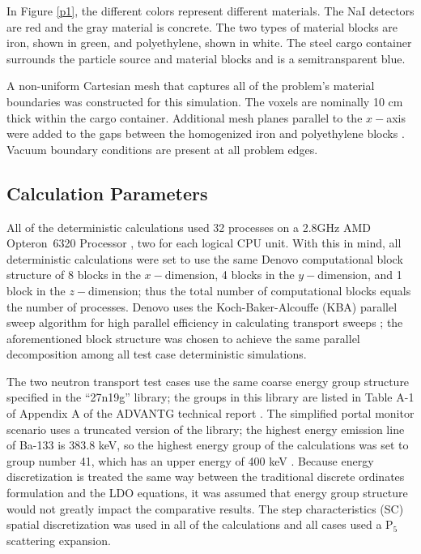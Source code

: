 \documentclass{article} %
\begin{document}
In Figure \ref{p1}, the different colors represent different materials. The NaI
detectors are red and the gray material is concrete. The two types of material
blocks are iron, shown in green, and polyethylene, shown in white. The steel
cargo container surrounds the particle source and material blocks and is a
semitransparent blue.

A non-uniform Cartesian mesh that captures all of the problem's material
boundaries was constructed for this simulation. The voxels are nominally 10 cm
thick within the cargo container. Additional mesh planes parallel to the
$x-$axis were added to the gaps between the homogenized iron and polyethylene
blocks \cite{advantg}. Vacuum boundary conditions are present at all problem
edges.

\subsection{Calculation Parameters}

All of the deterministic calculations used 32 processes on a 2.8GHz AMD 
Opteron\texttrademark\ 6320 Processor \cite{amd}, two for each logical CPU
unit. With this in mind, all deterministic calculations were set to use the
same Denovo computational block structure of 8 blocks 
in the $x-$dimension, 4 blocks in the $y-$dimension, and 1 block in the 
$z-$dimension; thus the total number of computational blocks equals the number
of processes. Denovo uses the Koch-Baker-Alcouffe (KBA) parallel sweep
algorithm for high parallel efficiency in calculating transport sweeps
\cite{denovo}; the aforementioned block structure was chosen to achieve the
same parallel decomposition among all test case deterministic simulations. 

The two neutron transport test cases use the same coarse energy group structure
specified in  the ``27n19g'' library; the groups in this library are listed in 
Table A-1 of Appendix A of the ADVANTG technical report \cite{advantg}.
The simplified portal monitor scenario uses a truncated version of the library;
the highest energy emission line of Ba-133 is 383.8 keV, so the highest energy
group of the calculations was set to group number 41, which has an upper energy
of 400 keV \cite{advantg}. Because 
energy discretization is treated the same way between the traditional discrete
ordinates formulation and the LDO equations, it was assumed that energy group 
structure would not greatly impact the comparative results.
The step characteristics (SC) spatial discretization was used in all of the
calculations and all cases used a P$_5$ scattering expansion.
\end{document}
